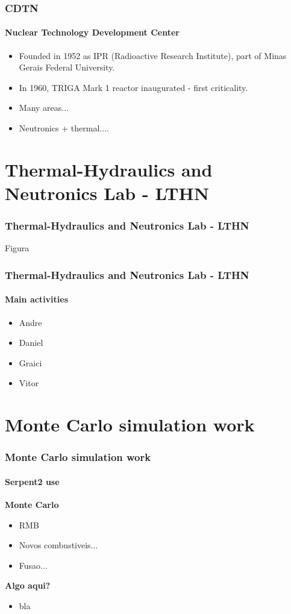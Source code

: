 \documentclass[svgnames,smaller,table]{beamer}
\begin{document}
\begin{frame}
  \frametitle{CDTN}
  \framesubtitle{Nuclear Technology Development Center}
  \begin{itemize}
  \item Founded in 1952 as IPR (Radioactive Research Institute), part of
    Minas Gerais Federal University.
  \item In 1960, TRIGA Mark 1 reactor inaugurated - first criticality.
  \item Many areas...
    \item Neutronics + thermal....
  \end{itemize}
\end{frame}


\section{Thermal-Hydraulics and Neutronics Lab - LTHN}
\begin{frame}
  \frametitle{Thermal-Hydraulics and Neutronics Lab - LTHN}
  \begin{center}
    Figura
  \end{center}
\end{frame}

\begin{frame}
  \frametitle{Thermal-Hydraulics and Neutronics Lab - LTHN}
  \framesubtitle{Main activities}
  \begin{center}
    \begin{itemize}
    \item Andre
    \item Daniel
    \item Graici
    \item Vitor
    \end{itemize}
  \end{center}
\end{frame}

\section{Monte Carlo simulation work}
\begin{frame}
  \frametitle{Monte Carlo simulation work}
  \framesubtitle{Serpent2 use}
  \textbf{Monte Carlo}
    \begin{itemize}
    \item RMB
    \item Novos combustiveis...
    \item Fusao...
    \end{itemize}
    \vspace{10px}
  \textbf{Algo aqui?}
    \begin{itemize}
    \item bla
    \end{itemize}
\end{frame}
\end{document}
